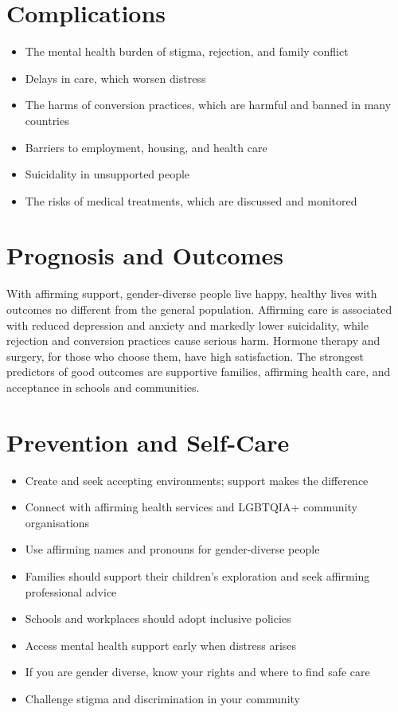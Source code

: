\section*{Complications}
\begin{itemize}
    \item The mental health burden of stigma, rejection, and family conflict
    \item Delays in care, which worsen distress
    \item The harms of conversion practices, which are harmful and banned in many countries
    \item Barriers to employment, housing, and health care
    \item Suicidality in unsupported people
    \item The risks of medical treatments, which are discussed and monitored
\end{itemize}

\section*{Prognosis and Outcomes}
With affirming support, gender-diverse people live happy, healthy lives with outcomes no different from the general population. Affirming care is associated with reduced depression and anxiety and markedly lower suicidality, while rejection and conversion practices cause serious harm. Hormone therapy and surgery, for those who choose them, have high satisfaction. The strongest predictors of good outcomes are supportive families, affirming health care, and acceptance in schools and communities.

\section*{Prevention and Self-Care}
\begin{itemize}
    \item Create and seek accepting environments; support makes the difference
    \item Connect with affirming health services and LGBTQIA+ community organisations
    \item Use affirming names and pronouns for gender-diverse people
    \item Families should support their children's exploration and seek affirming professional advice
    \item Schools and workplaces should adopt inclusive policies
    \item Access mental health support early when distress arises
    \item If you are gender diverse, know your rights and where to find safe care
    \item Challenge stigma and discrimination in your community
\end{itemize}


